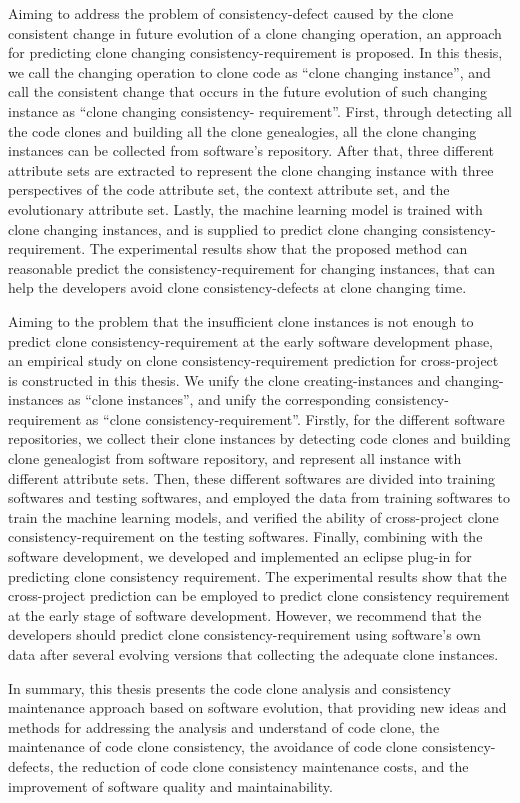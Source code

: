 {Aiming to address the problem of consistency-defect caused by the clone consistent change in future evolution of a clone changing operation,  an approach for predicting clone changing consistency-requirement is proposed. 
In this thesis, we call the changing operation to clone code as ``clone changing instance'', and call the consistent change that occurs in the future evolution of such changing instance as ``clone changing consistency- requirement''.
First, through detecting all the code clones and building all the clone genealogies, all the clone changing instances can be collected  from software's repository.
After that, three different attribute sets are extracted to represent the clone changing instance with three perspectives of the code attribute set, the context attribute set, and the evolutionary attribute set.
Lastly, the machine learning model is trained with clone changing instances, and  is supplied to predict clone changing consistency-requirement.
The experimental results show that the proposed method can reasonable predict the consistency-requirement for changing instances, that can help the developers avoid clone consistency-defects at clone changing time.

Aiming to the problem that the insufficient clone instances is not enough to predict clone consistency-requirement at the early software development phase, an empirical study on clone consistency-requirement prediction for cross-project is constructed in this thesis.
We unify the clone creating-instances and changing-instances as ``clone instances'', and unify the corresponding consistency-requirement as ``clone consistency-requirement''.
Firstly, for the different software repositories, we collect their clone instances by detecting code clones and building clone genealogist from software repository, and represent all instance with different attribute sets.
Then, these different softwares are divided into training softwares and testing softwares, and employed the data from training softwares to train the machine learning models, and verified the ability of cross-project clone consistency-requirement on the testing softwares.
Finally, combining with the software development, we developed and implemented an eclipse plug-in for predicting clone consistency requirement. 
The experimental results show that the cross-project prediction can be employed to predict clone consistency requirement at the early stage of software development.
However, we recommend that the developers should predict clone consistency-requirement using  software's own data after several evolving versions that collecting the adequate clone instances.

In summary, this thesis presents the code clone analysis and consistency maintenance approach based on software evolution, that providing new ideas and methods for addressing the analysis and understand of code clone, the maintenance of code clone consistency, the avoidance of code clone consistency-defects, the reduction of code clone consistency maintenance costs, and the improvement of software quality and maintainability.
}


\makecover
\clearpage 
